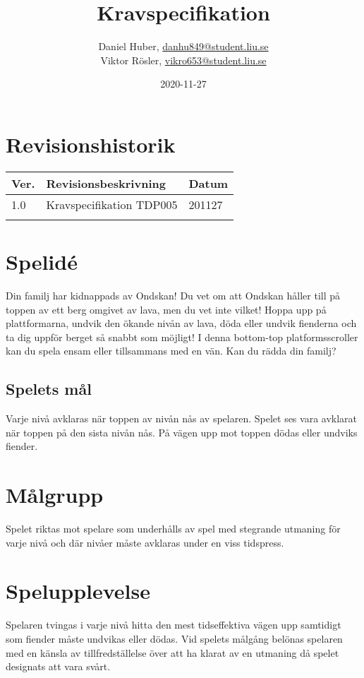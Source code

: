 \documentclass{TDP005mall}
\author{Daniel Huber, \url{danhu849@student.liu.se}\\
  Viktor Rösler, \url{vikro653@student.liu.se}}
\title{Kravspecifikation}
\date{2020-11-27}
\begin{document}
\projectpage
\tableofcontents
\newpage
\section{Revisionshistorik}
\begin{table}[!h]
\begin{tabularx}{\linewidth}{|l|X|l|}
\hline
  Ver. & Revisionsbeskrivning & Datum \\\hline
1.0 & Kravspecifikation TDP005 & 201127 \\\hline
\\\hline
\end{tabularx}
\end{table}


\section{Spelid\'{e} }
Din familj har kidnappads av Ondskan! Du vet om att Ondskan håller till på toppen av ett berg omgivet av lava, men du vet inte vilket! Hoppa upp på plattformarna, undvik den ökande nivån av lava, döda eller undvik fienderna och ta dig uppför berget så snabbt som möjligt! I denna bottom-top platformsscroller kan du spela ensam eller tillsammans med en vän. Kan du rädda din familj? 

\subsection{Spelets mål}
Varje nivå avklaras när toppen av nivån nås av spelaren. Spelet ses vara avklarat när toppen på den sista nivån nås. På vägen upp mot toppen dödas eller undviks fiender. 

\section{Målgrupp}%
Spelet riktas mot spelare som underhålls av spel med stegrande utmaning för varje nivå och där nivåer måste avklaras under en viss tidspress. 

\section{Spelupplevelse}%
Spelaren tvingas i varje nivå hitta den mest tidseffektiva vägen upp samtidigt som fiender måste undvikas eller dödas. Vid spelets målgång belönas spelaren med en känsla av tillfredställelse över att ha klarat av en utmaning då spelet designats att vara svårt.
\end{document}
